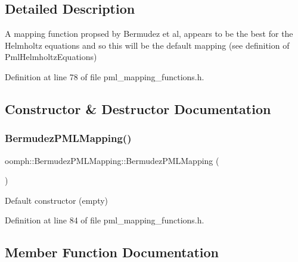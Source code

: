 \subsection{Detailed Description}
A mapping function propsed by Bermudez et al, appears to be the best for the Helmholtz equations and so this will be the default mapping (see definition of Pml\+Helmholtz\+Equations) 

Definition at line 78 of file pml\+\_\+mapping\+\_\+functions.\+h.



\subsection{Constructor \& Destructor Documentation}
\mbox{\label{classoomph_1_1BermudezPMLMapping_a042e18373f3f5b6cc9611a0ceb4391a3}} 
\subsubsection{\texorpdfstring{Bermudez\+P\+M\+L\+Mapping()}{BermudezPMLMapping()}}
{\footnotesize\ttfamily oomph\+::\+Bermudez\+P\+M\+L\+Mapping\+::\+Bermudez\+P\+M\+L\+Mapping (\begin{DoxyParamCaption}{ }\end{DoxyParamCaption})\hspace{0.3cm}{\ttfamily [inline]}}



Default constructor (empty) 



Definition at line 84 of file pml\+\_\+mapping\+\_\+functions.\+h.



\subsection{Member Function Documentation}
\mbox{\label{classoomph_1_1BermudezPMLMapping_adf727a41969fc98de8122c502d562c57}} 
